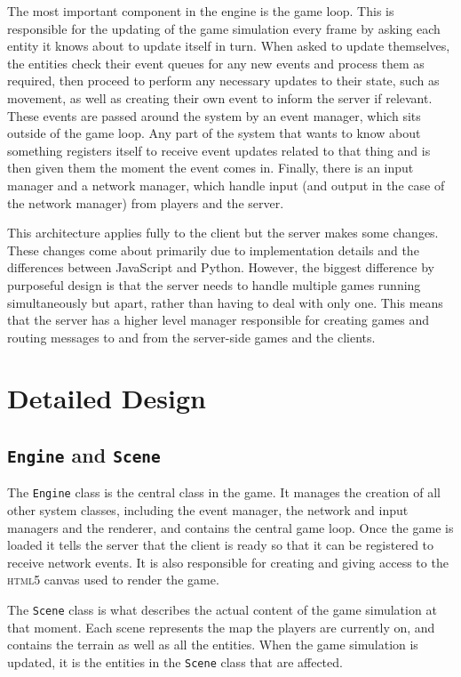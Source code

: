 The most important component in the engine is the game loop. This is responsible for the updating of the game simulation every frame by asking each entity it knows about to update itself in turn. When asked to update themselves, the entities check their event queues for any new events and process them as required, then proceed to perform any necessary updates to their state, such as movement, as well as creating their own event to inform the server if relevant. These events are passed around the system by an event manager, which sits outside of the game loop. Any part of the system that wants to know about something registers itself to receive event updates related to that thing and is then given them the moment the event comes in. Finally, there is an input manager and a network manager, which handle input (and output in the case of the network manager) from players and the server.

This architecture applies fully to the client but the server makes some changes. These changes come about primarily due to implementation details and the differences between JavaScript and Python. However, the biggest difference by purposeful design is that the server needs to handle multiple games running simultaneously but apart, rather than having to deal with only one. This means that the server has a higher level manager responsible for creating games and routing messages to and from the server-side games and the clients.


\section{Detailed Design}

\subsection{\texttt{Engine} and \texttt{Scene}}
The \texttt{Engine} class is the central class in the game. It manages the creation of all other system classes, including the event manager, the network and input managers and the renderer, and contains the central game loop. Once the game is loaded it tells the server that the client is ready so that it can be registered to receive network events. It is also responsible for creating and giving access to the \textsc{html5} canvas used to render the game.

The \texttt{Scene} class is what describes the actual content of the game simulation at that moment. Each scene represents the map the players are currently on, and contains the terrain as well as all the entities. When the game simulation is updated, it is the entities in the \texttt{Scene} class that are affected.

